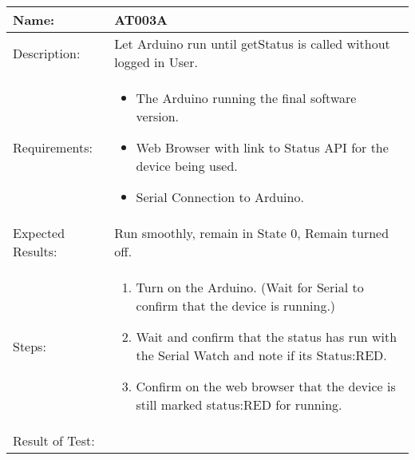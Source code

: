 \begin{table}[h]
	\centering
		\begin{tabular*}{\textwidth}{|l|l|}
		\hline
		\hline
		Name: & AT003A\\
		\hline
		Description: & \parbox{0.70\textwidth}{Let Arduino run until getStatus is called without logged in User.}\\
		\hline
		Requirements: & \parbox{0.70\textwidth}{
		\begin{itemize}
			\item The Arduino running the final software version.
			\item Web Browser with link to Status API for the device being used.
			\item Serial Connection to Arduino.
		\end{itemize}}
		\\
		\hline
		Expected Results: & \parbox{.70\textwidth}{Run smoothly, remain in State 0, Remain turned off.}\\
		\hline
		Steps: & \parbox{.70\textwidth}{
		\begin{enumerate}
			\item Turn on the Arduino. (Wait for Serial to confirm that the device is running.)
			\item Wait and confirm that the status has run with the Serial Watch and note if its Status:RED.
			\item Confirm on the web browser that the device is still marked status:RED for running.
		\end{enumerate}}
		\\
		\hline
		Result of Test: & \\
		\hline
		\end{tabular*}
\end{table}
